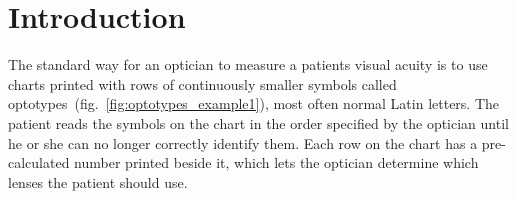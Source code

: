\documentclass[12pt,a4paper,notitlepage]{report}
\begin{document}
\renewcommand\thechapter{\arabic{chapter}}
\setcounter{page}{1}
\chapter{ Introduction}%
The standard way for an optician to measure a patients visual acuity is to use charts printed with rows of continuously smaller symbols called optotypes~(fig.~\ref{fig:optotypes_example1}), most often normal Latin letters. The patient reads the symbols on the chart in the order specified by the optician until he or she can no longer correctly identify them. Each row on the chart has a pre-calculated number printed beside it, which lets the optician determine which lenses the patient should use.
\end{document}
